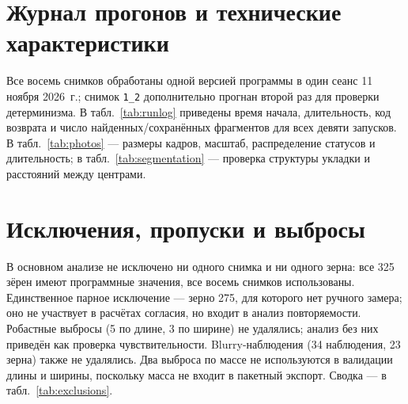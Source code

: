 \documentclass[12pt,a4paper]{article}
\begin{document}
\section{Журнал прогонов и технические характеристики}

Все восемь снимков обработаны одной версией программы в один сеанс
11 ноября 2026~г.; снимок \texttt{1\_2} дополнительно прогнан второй раз
для проверки детерминизма. В табл.~\ref{tab:runlog} приведены время
начала, длительность, код возврата и число найденных/сохранённых
фрагментов для всех девяти запусков.
В табл.~\ref{tab:photos} — размеры кадров, масштаб, распределение
статусов и длительность; в табл.~\ref{tab:segmentation} — проверка
структуры укладки и расстояний между центрами.

\begin{table}[htbp]
\centering\small
\setlength{\tabcolsep}{4pt}
\caption{Журнал пакетных прогонов (девять запусков; \texttt{1\_2} —
контрольный повтор).}
\label{tab:runlog}

\end{table}

\begin{table}[htbp]
\centering\scriptsize
\setlength{\tabcolsep}{4pt}
\caption{Характеристики снимков и распределение статусов качества.}
\label{tab:photos}

\end{table}

\begin{table}[htbp]
\centering\scriptsize
\caption{Проверка структуры укладки: число объектов, ряды, расстояния до
ближайшего соседа (NN) и размеры ограничивающих рамок.}
\label{tab:segmentation}

\end{table}

\section{Исключения, пропуски и выбросы}

В основном анализе не исключено ни одного снимка и ни одного зерна:
все 325 зёрен имеют программные значения, все восемь снимков
использованы. Единственное парное исключение — зерно 275, для которого
нет ручного замера; оно не участвует в расчётах согласия, но входит в
анализ повторяемости. Робастные выбросы (5 по длине, 3 по ширине) не
удалялись; анализ без них приведён как проверка чувствительности.
Blurry-наблюдения (34 наблюдения, 23 зерна) также не удалялись.
Два выброса по массе не используются в валидации длины и ширины,
поскольку масса не входит в пакетный экспорт. Сводка — в
табл.~\ref{tab:exclusions}.
\end{document}
